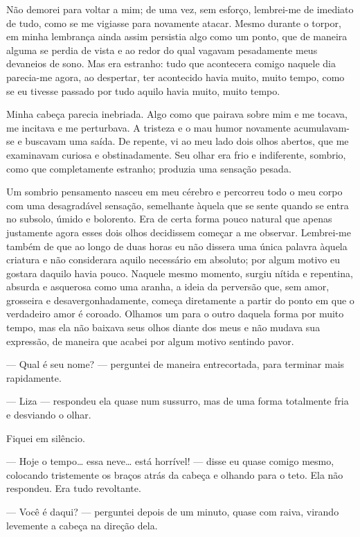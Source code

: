 Não demorei para voltar a mim; de uma vez, sem esforço, lembrei-me de
imediato de tudo, como se me vigiasse para novamente atacar. Mesmo
durante o torpor, em minha lembrança ainda assim persistia algo como um
ponto, que de maneira alguma se perdia de vista e ao redor do qual
vagavam pesadamente meus devaneios de sono. Mas era estranho: tudo que
acontecera comigo naquele dia parecia-me agora, ao despertar, ter
acontecido havia muito, muito tempo, como se eu tivesse passado por
tudo aquilo havia muito, muito tempo.

Minha cabeça parecia inebriada. Algo como que pairava sobre mim e me
tocava, me incitava e me perturbava. A tristeza e o mau humor novamente
acumulavam-se e buscavam uma saída. De repente, vi ao meu lado dois
olhos abertos, que me examinavam curiosa e obstinadamente. Seu olhar
era frio e indiferente, sombrio, como que completamente estranho;
produzia uma sensação pesada.

Um sombrio pensamento nasceu em meu cérebro e percorreu todo o meu corpo
com uma desagradável sensação, semelhante àquela que se sente quando se
entra no subsolo, úmido e bolorento. Era de certa forma pouco natural
que apenas justamente agora esses dois olhos decidissem começar a me
observar. Lembrei-me também de que ao longo de duas horas eu não
dissera uma única palavra àquela criatura e não considerara aquilo
necessário em absoluto; por algum motivo eu gostara daquilo havia
pouco. Naquele mesmo momento, surgiu nítida e repentina, absurda e
asquerosa como uma aranha, a ideia da perversão que, sem amor,
grosseira e desavergonhadamente, começa diretamente a partir do ponto
em que o verdadeiro amor é coroado. Olhamos um para o outro daquela
forma por muito tempo, mas ela não baixava seus olhos diante dos meus e
não mudava sua expressão, de maneira que acabei por algum motivo
sentindo pavor.

--- Qual é seu nome? --- perguntei de maneira entrecortada, para terminar
mais rapidamente.

--- Liza --- respondeu ela quase num sussurro, mas de uma forma totalmente
fria e desviando o olhar.

Fiquei em silêncio.

--- Hoje o tempo\ldots{} essa neve\ldots{} está horrível! --- disse eu quase comigo
mesmo, colocando tristemente os braços atrás da cabeça e olhando para o
teto. Ela não respondeu. Era tudo revoltante.

--- Você é daqui? --- perguntei depois de um minuto, quase com raiva,
virando levemente a cabeça na direção dela.

